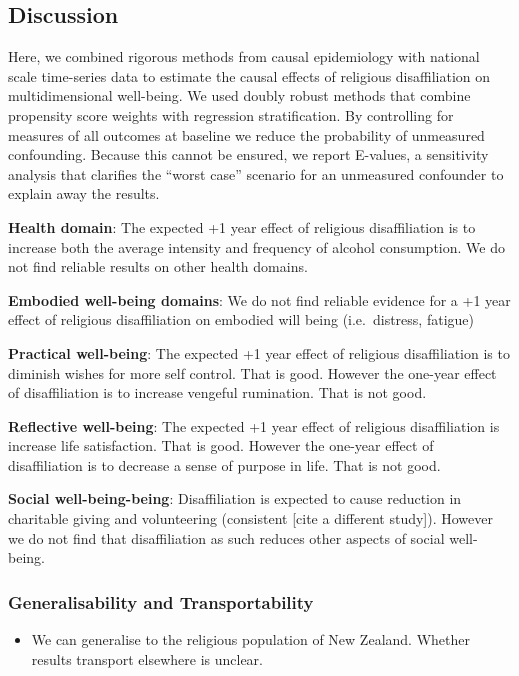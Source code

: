 \documentclass[
  singlecolumn,
  9pt]{article}
\providecommand{\tightlist}{%
  \setlength{\itemsep}{0pt}\setlength{\parskip}{0pt}}\usepackage{longtable,booktabs,array}
\begin{document}
\subsection{Discussion}\label{discussion}

Here, we combined rigorous methods from causal epidemiology with
national scale time-series data to estimate the causal effects of
religious disaffiliation on multidimensional well-being. We used doubly
robust methods that combine propensity score weights with regression
stratification. By controlling for measures of all outcomes at baseline
we reduce the probability of unmeasured confounding. Because this cannot
be ensured, we report E-values, a sensitivity analysis that clarifies
the ``worst case'' scenario for an unmeasured confounder to explain away
the results.

\textbf{Health domain}: The expected +1 year effect of religious
disaffiliation is to increase both the average intensity and frequency
of alcohol consumption. We do not find reliable results on other health
domains.

\textbf{Embodied well-being domains}: We do not find reliable evidence
for a +1 year effect of religious disaffiliation on embodied will being
(i.e.~distress, fatigue)

\textbf{Practical well-being}: The expected +1 year effect of religious
disaffiliation is to diminish wishes for more self control. That is
good. However the one-year effect of disaffiliation is to increase
vengeful rumination. That is not good.

\textbf{Reflective well-being}: The expected +1 year effect of religious
disaffiliation is increase life satisfaction. That is good. However the
one-year effect of disaffiliation is to decrease a sense of purpose in
life. That is not good.

\textbf{Social well-being-being}: Disaffiliation is expected to cause
reduction in charitable giving and volunteering (consistent {[}cite a
different study{]}). However we do not find that disaffiliation as such
reduces other aspects of social well-being.

\subsubsection{Generalisability and
Transportability}\label{generalisability-and-transportability}

\begin{itemize}
\tightlist
\item
  We can generalise to the religious population of New Zealand. Whether
  results transport elsewhere is unclear.
\end{itemize}
\end{document}
